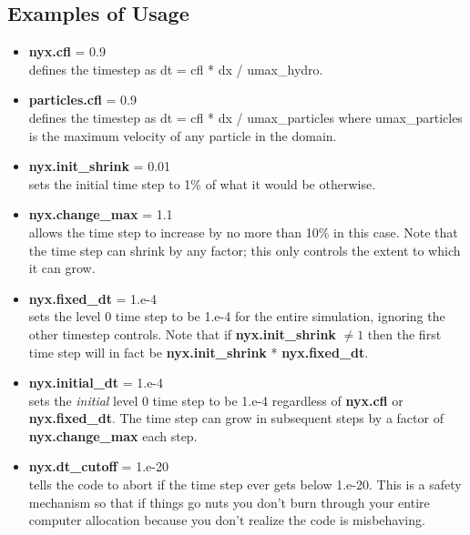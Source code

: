 \subsection{Examples of Usage}

\begin{itemize}

\item {\bf nyx.cfl} = 0.9 \\
defines the timestep as dt = cfl * dx / umax\_hydro.

\item {\bf particles.cfl} = 0.9 \\
defines the timestep as dt = cfl * dx / umax\_particles where umax\_particles is the maximum velocity 
of any particle in the domain.

\item {\bf nyx.init\_shrink} = 0.01 \\
sets the initial time step to 1\% of what it would be otherwise.  

\item {\bf nyx.change\_max} = 1.1\\
allows the time step to increase by no more than 10\% in this case.    Note that the time step
can shrink by any factor; this only controls the extent to which it can grow.

\item {\bf nyx.fixed\_dt} = 1.e-4\\
sets the level 0 time step to be 1.e-4 for the entire simulation, 
ignoring the other timestep controls.   Note that if {\bf nyx.init\_shrink} $\neq 1$
then the first time step will in fact be {\bf nyx.init\_shrink} * {\bf nyx.fixed\_dt}.

\item {\bf nyx.initial\_dt} = 1.e-4\\
sets the {\it initial} level 0 time step to be 1.e-4 regardless of 
{\bf nyx.cfl} or {\bf nyx.fixed\_dt}.  The time step can
grow in subsequent steps by a factor of {\bf nyx.change\_max} each step.

\item {\bf nyx.dt\_cutoff} = 1.e-20\\
tells the code to abort if the time step ever gets below 1.e-20. 
This is a safety mechanism so that if things go nuts you don't burn through your 
entire computer allocation because you don't realize the code is misbehaving.

\end{itemize}

